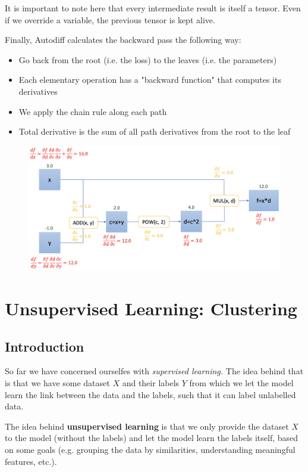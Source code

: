 \documentclass[a4paper]{extarticle}
\begin{document}
It is important to note here that every intermediate result is itself a tensor. Even if we override a variable, the previous tensor is kept alive.

Finally, Autodiff calculates the backward pass the following way:
\begin{itemize}
    \item Go back from the root (i.e. the loss) to the leaves (i.e. the parameters)
    \item Each elementary operation has a "backward function" that computes its derivatives
    \item We apply the chain rule along each path
    \item Total derivative is the sum of all path derivatives from the root to the leaf
\end{itemize}

\begin{figure}[H]
    \includegraphics[width=15cm]{../images/IntroML_Fig8-3}
    \centering
\end{figure}

\section{Unsupervised Learning: Clustering}

\subsection{Introduction}

So far we have concerned ourselfes with \textit{supervised learning.} The idea behind that is that we have some dataset $X$ and their labels $Y$ from which we let the model learn the link between the data and the labels, such that it can label unlabelled data.

The idea behind \textbf{unsupervised learning} is that we only provide the dataset $X$ to the model (without the labels) and let the model learn the labels itself, based on some goals (e.g. grouping the data by similarities, understanding meaningful features, etc.).
\end{document}
